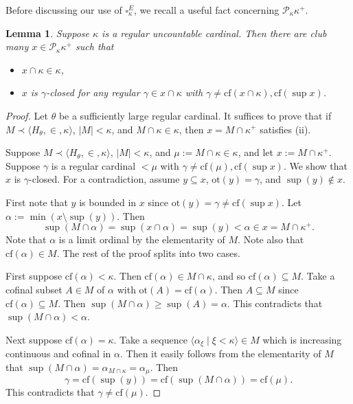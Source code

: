 \documentclass[a4paper,12pt,reqno,oneside]{amsart}
\theoremstyle{plain}
\newtheorem{lemma}[theorem]{Lemma}
\newcommand{\cof}{\mathrm{cf}}
\newcommand{\otp}{\mathrm{ot}}
\newcommand{\mcal}{\mathcal}
\begin{document}
Before discussing our use of $\square_{\kappa}^E$, we recall a useful fact concerning $\mcal{P}_\kappa \kappa^+$.


\begin{lemma}\label{lem:gamma_closed}
Suppose $\kappa$ is a regular uncountable cardinal. Then there are club many $x \in \mcal{P}_\kappa \kappa^+$ such that
\begin{itemize}
\item[(i)] $x \cap \kappa \in \kappa$,
\item[(ii)] $x$ is $\gamma$-closed for any regular $\gamma \in x \cap \kappa$ with $\gamma \neq \cof ( x \cap \kappa ) , \cof ( \sup x )$.
\end{itemize}
\end{lemma} 

\begin{proof}
Let $\theta$ be a sufficiently large regular cardinal. It suffices to prove that if $M \prec \langle H_\theta , \in , \kappa \rangle$, $|M| < \kappa$, and $M \cap \kappa \in \kappa$, then $x = M \cap \kappa^+$ satisfies (ii).

Suppose $M \prec \langle H_\theta , \in , \kappa \rangle$, $|M| < \kappa$, and $\mu := M \cap \kappa \in \kappa$, and let $x := M \cap \kappa^+$. Suppose $\gamma$ is a regular cardinal $< \mu$ with $\gamma \neq \cof ( \mu ) , \cof ( \sup x )$. We show that $x$ is $\gamma$-closed. For a contradiction, assume $y \subseteq x$, $\otp (y) = \gamma$, and $\sup (y) \notin x$.

First note that $y$ is bounded in $x$ since $\otp (y) = \gamma \neq \cof ( \sup x )$. Let $\alpha := \min ( x \setminus \sup (y) )$. Then
\[
\sup ( M \cap \alpha ) = \sup ( x \cap \alpha ) = \sup (y) < \alpha \in x = M \cap \kappa^+ .
\]
Note that $\alpha$ is a limit ordinal by the elementarity of $M$. Note also that $\cof ( \alpha ) \in M$. The rest of the proof splits into two cases.

First suppose $\cof ( \alpha ) < \kappa$. Then $\cof ( \alpha ) \in M \cap \kappa$, and so $\cof ( \alpha ) \subseteq M$. Take a cofinal subset $A \in M$ of $\alpha$ with $\otp (A) = \cof ( \alpha )$. Then $A \subseteq M$ since $\cof ( \alpha ) \subseteq M$. Then $\sup ( M \cap \alpha ) \geq \sup (A) = \alpha$. This contradicts that $\sup ( M \cap \alpha ) < \alpha$.

Next suppose $\cof ( \alpha ) = \kappa$. Take a sequence $\langle \alpha_\xi \mid \xi < \kappa \rangle \in M$ which is increasing continuous and cofinal in $\alpha$. Then it easily follows from the elementarity of $M$ that $\sup ( M \cap \alpha ) = \alpha_{M \cap \kappa} = \alpha_\mu$. Then
\[
\gamma = \cof ( \sup (y) ) = \cof ( \sup ( M \cap \alpha ) ) = \cof ( \mu ) .
\]
This contradicts that $\gamma \neq \cof ( \mu )$.
\end{proof} %
\end{document}
